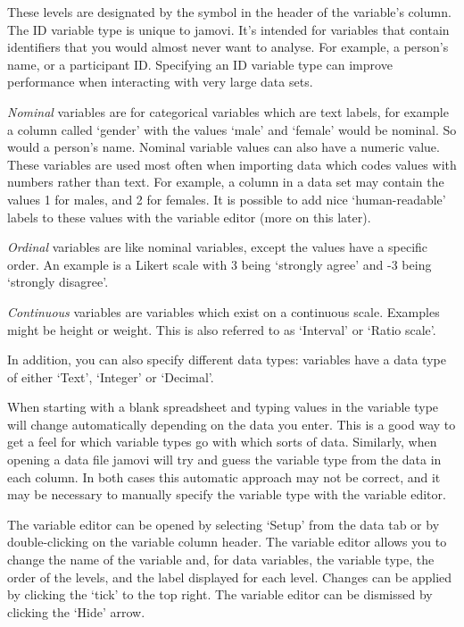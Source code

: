\documentclass[
  a4paper,
]{book}
\begin{document}
These levels are designated by the symbol in the header of the
variable's column. The ID variable type is unique to jamovi. It's
intended for variables that contain identifiers that you would almost
never want to analyse. For example, a person's name, or a participant
ID. Specifying an ID variable type can improve performance when
interacting with very large data sets.

\emph{Nominal} variables are for categorical variables which are text
labels, for example a column called `gender' with the values `male' and
`female' would be nominal. So would a person's name. Nominal variable
values can also have a numeric value. These variables are used most
often when importing data which codes values with numbers rather than
text. For example, a column in a data set may contain the values 1 for
males, and 2 for females. It is possible to add nice `human-readable'
labels to these values with the variable editor (more on this later).

\emph{Ordinal} variables are like nominal variables, except the values
have a specific order. An example is a Likert scale with 3 being
`strongly agree' and -3 being `strongly disagree'.

\emph{Continuous} variables are variables which exist on a continuous
scale. Examples might be height or weight. This is also referred to as
`Interval' or `Ratio scale'.

In addition, you can also specify different data types: variables have a
data type of either `Text', `Integer' or `Decimal'.

When starting with a blank spreadsheet and typing values in the variable
type will change automatically depending on the data you enter. This is
a good way to get a feel for which variable types go with which sorts of
data. Similarly, when opening a data file jamovi will try and guess the
variable type from the data in each column. In both cases this automatic
approach may not be correct, and it may be necessary to manually specify
the variable type with the variable editor.

The variable editor can be opened by selecting `Setup' from the data tab
or by double-clicking on the variable column header. The variable editor
allows you to change the name of the variable and, for data variables,
the variable type, the order of the levels, and the label displayed for
each level. Changes can be applied by clicking the `tick' to the top
right. The variable editor can be dismissed by clicking the `Hide'
arrow.
\end{document}
